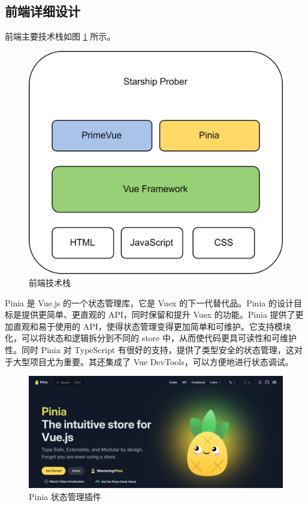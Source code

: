 \documentclass{base}
\begin{document}
\subsection{前端详细设计}

前端主要技术栈如图 \ref{fig:frontend} 所示。

\begin{figure}[H]
	\centering
	\includegraphics[width=0.7\linewidth]{images/FrontEnd}
	\caption{前端技术栈}
	\label{fig:frontend}
\end{figure}


Pinia 是 Vue.js 的一个状态管理库，它是 Vuex 的下一代替代品。Pinia 的设计目标是提供更简单、更直观的 API，同时保留和提升 Vuex 的功能。Pinia 提供了更加直观和易于使用的 API，使得状态管理变得更加简单和可维护。它支持模块化，可以将状态和逻辑拆分到不同的 store 中，从而使代码更具可读性和可维护性。同时 Pinia 对 TypeScript 有很好的支持，提供了类型安全的状态管理，这对于大型项目尤为重要。其还集成了 Vue DevTools，可以方便地进行状态调试。

\begin{figure}[H]
	\centering
	\includegraphics[width=\linewidth]{images/Pinia}
	\caption{Pinia 状态管理插件}
	\label{fig:pinia}
\end{figure}
\end{document}
